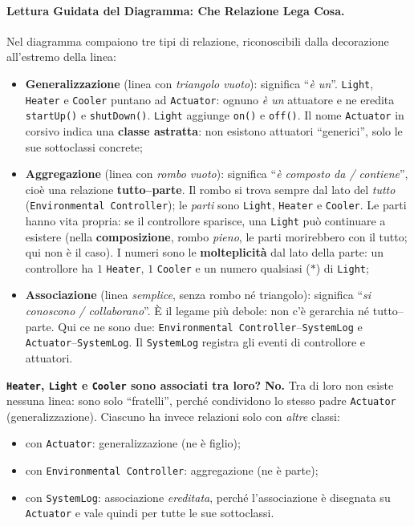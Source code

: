 \documentclass[12pt]{extarticle}
\begin{document}
\paragraph{Lettura Guidata del Diagramma: Che Relazione Lega Cosa.}
Nel diagramma compaiono tre tipi di relazione, riconoscibili dalla decorazione all'estremo della linea:
\begin{itemize}
    \item \textbf{Generalizzazione} (linea con \emph{triangolo vuoto}): significa ``\textit{è un}''. \texttt{Light}, \texttt{Heater} e \texttt{Cooler} puntano ad \texttt{Actuator}: ognuno \emph{è un} attuatore e ne eredita \texttt{startUp()} e \texttt{shutDown()}. \texttt{Light} aggiunge \texttt{on()} e \texttt{off()}. Il nome \texttt{Actuator} in corsivo indica una \textbf{classe astratta}: non esistono attuatori ``generici'', solo le sue sottoclassi concrete;
    \item \textbf{Aggregazione} (linea con \emph{rombo vuoto}): significa ``\textit{è composto da / contiene}'', cioè una relazione \textbf{tutto--parte}. Il rombo si trova sempre dal lato del \emph{tutto} (\texttt{Environmental Controller}); le \emph{parti} sono \texttt{Light}, \texttt{Heater} e \texttt{Cooler}. Le parti hanno vita propria: se il controllore sparisce, una \texttt{Light} può continuare a esistere (nella \textbf{composizione}, rombo \emph{pieno}, le parti morirebbero con il tutto; qui non è il caso). I numeri sono le \textbf{molteplicità} dal lato della parte: un controllore ha $1$ \texttt{Heater}, $1$ \texttt{Cooler} e un numero qualsiasi ($*$) di \texttt{Light};
    \item \textbf{Associazione} (linea \emph{semplice}, senza rombo né triangolo): significa ``\textit{si conoscono / collaborano}''. È il legame più debole: non c'è gerarchia né tutto--parte. Qui ce ne sono due: \texttt{Environmental Controller}--\texttt{SystemLog} e \texttt{Actuator}--\texttt{SystemLog}. Il \texttt{SystemLog} registra gli eventi di controllore e attuatori.
\end{itemize}

\noindent\textbf{\texttt{Heater}, \texttt{Light} e \texttt{Cooler} sono associati tra loro?} \textbf{No.} Tra di loro non esiste nessuna linea: sono solo ``fratelli'', perché condividono lo stesso padre \texttt{Actuator} (generalizzazione). Ciascuno ha invece relazioni solo con \emph{altre} classi:
\begin{itemize}
    \item con \texttt{Actuator}: generalizzazione (ne è figlio);
    \item con \texttt{Environmental Controller}: aggregazione (ne è parte);
    \item con \texttt{SystemLog}: associazione \emph{ereditata}, perché l'associazione è disegnata su \texttt{Actuator} e vale quindi per tutte le sue sottoclassi.
\end{itemize}
\end{document}
